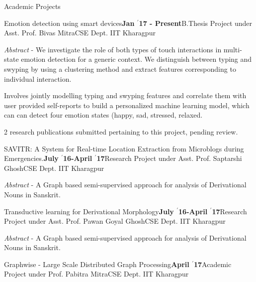 \documentclass{resume} %
\begin{document}
\begin{rSection}{Academic Projects}

\begin{rSubsection}{ \large Emotion detection using smart devices}{\textbf{\large Jan $^{\prime}$17 - Present}}{B.Thesis Project under Asst. Prof. Bivas Mitra}{CSE Dept. IIT Kharagpur}
\item \textit{Abstract} - We investigate the role of both types of touch interactions in multi-state emotion detection for a generic context. We distinguish between typing and swyping by using a clustering method and extract features corresponding to individual interaction.

\item Involves jointly modelling typing and swyping features and correlate them with user provided self-reports to build a personalized machine learning model, which can can detect four emotion states (happy, sad, stressed, relaxed.

\item 2 research publications submitted pertaining to this project, pending review.
\end{rSubsection}

\begin{rSubsection}{ \large SAVITR: A System for Real-time Location Extraction from Microblogs during Emergencies.}{\textbf{\large July $^{\prime}$16-April $^{\prime}$17}}{Research Project under Asst. Prof. Saptarshi Ghosh}{CSE Dept. IIT Kharagpur}
\item \textit{Abstract} - A Graph based semi-supervised approach for analysis of Derivational Nouns in Sanskrit.

\end{rSubsection}

\begin{rSubsection}{ \large Transductive learning for Derivational Morphology}{\textbf{\large July $^{\prime}$16-April $^{\prime}$17}}{Research Project under Asst. Prof. Pawan Goyal Ghosh}{CSE Dept. IIT Kharagpur}
\item \textit{Abstract} - A Graph based semi-supervised approach for analysis of Derivational Nouns in Sanskrit.

\end{rSubsection}

\begin{rSubsection}{ \large Graphwise - Large Scale Distributed Graph Processing}{\textbf{\large April $^{\prime}$17}}{Academic Project under Prof. Pabitra Mitra}{CSE Dept. IIT Kharagpur}


\end{rSubsection}
\end{rSection}
\end{document}
